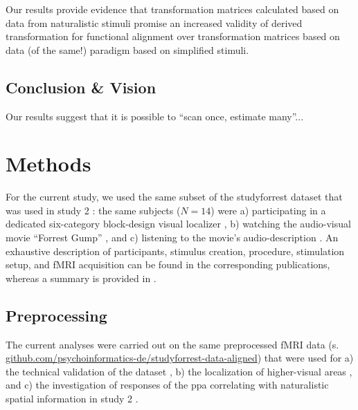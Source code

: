 %
Our results provide evidence that transformation matrices calculated based on
data from naturalistic stimuli promise an increased validity of derived
transformation for functional alignment over transformation matrices based on
data (of the same!) paradigm based on simplified stimuli.



\subsection{Conclusion \& Vision}


Our results suggest that it is possible to ``scan once, estimate many''...


\section{Methods}


For the current study, we used the same subset of the studyforrest dataset that
was used in study 2 \citep{haeusler2022processing}:
%
the same subjects ($N=14$) were
a) participating in a dedicated six-category block-design visual localizer
\citep{sengupta2016extension},
b) watching the audio-visual movie ``Forrest Gump''
\citep{hanke2016simultaneous}, and
c) listening to the movie's audio-description \citep{hanke2014audiomovie}.
An exhaustive description of participants, stimulus creation, procedure,
stimulation setup, and fMRI acquisition can be found in the corresponding
publications, whereas a summary is provided in \citet{haeusler2022processing}.



\subsection{Preprocessing}

The current analyses were carried out on the same preprocessed fMRI data (s.
\href{https://github.com/psychoinformatics-de/studyforrest-data-aligned
}{\url{github.com/psychoinformatics-de/studyforrest-data-aligned}}) that were
used for
%
a) the technical validation of the dataset \citep{hanke2016simultaneous},
%
b) the localization of higher-visual areas \citep{sengupta2016extension}, and
%
c) the investigation of responses of the \ac{ppa} correlating with naturalistic
spatial information in study 2 \citep{haeusler2022processing}.

